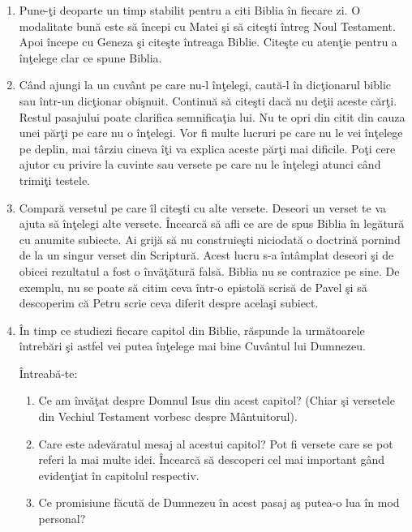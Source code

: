 \begin{enumerate}

	\item Pune-ţi deoparte un timp stabilit pentru a citi Biblia în fiecare zi. O modalitate bună este să începi cu Matei şi să citeşti întreg Noul Testament. Apoi începe cu Geneza şi citeşte întreaga Biblie. Citeşte cu atenţie pentru a înţelege clar ce spune Biblia.
	
	\item Când ajungi la un cuvânt pe care nu-l înţelegi, caută-l în dicţionarul biblic sau într-un dicţionar obişnuit. Continuă să citeşti dacă nu deţii aceste cărţi. Restul pasajului poate clarifica semnificaţia lui. Nu te opri din citit din cauza unei părţi pe care nu o înţelegi. Vor fi multe lucruri pe care nu le vei înţelege pe deplin, mai târziu cineva îţi va explica aceste părţi mai dificile. Poţi cere ajutor cu privire la cuvinte sau versete pe care nu le înţelegi atunci când trimiţi testele. 
	
	\item Compară versetul pe care îl citeşti cu alte versete. Deseori un verset te va ajuta să înţelegi alte versete. Încearcă să afli ce are de spus Biblia în legătură cu anumite subiecte. Ai grijă să nu construieşti niciodată o doctrină pornind de la un singur verset din Scriptură. Acest lucru s-a întâmplat deseori şi de obicei rezultatul a fost o învăţătură falsă. Biblia nu se contrazice pe sine. De exemplu, nu se poate să citim ceva într-o epistolă scrisă de Pavel şi să descoperim că Petru scrie ceva diferit despre acelaşi subiect. 
	
	\item În timp ce studiezi fiecare capitol din Biblie, răspunde la următoarele întrebări şi astfel vei putea înţelege mai bine Cuvântul lui Dumnezeu.
	
Întreabă-te:

	\begin{enumerate}
	
		\item Ce am învăţat despre Domnul Isus din acest capitol? (Chiar şi versetele din Vechiul Testament vorbesc despre Mântuitorul).
		
		\item Care este adevăratul mesaj al acestui capitol? Pot fi versete care se pot referi la mai multe idei. Încearcă să descoperi cel mai important gând evidenţiat în capitolul respectiv.
		
		\item Ce promisiune făcută de Dumnezeu în acest pasaj aş putea-o lua în mod personal?  
		

\end{enumerate}
\end{enumerate}
